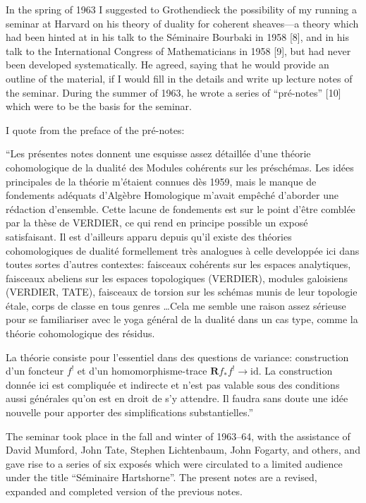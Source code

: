 \documentclass[12pt]{book}
\begin{document}
\frontmatter

\preface
In the spring of 1963 I suggested to Grothendieck the possibility of my running a seminar at Harvard on his theory of duality for coherent sheaves---a theory which had been hinted at in his talk to the Séminaire Bourbaki in 1958 [8],
and in his talk to the International Congress of Mathematicians in 1958 [9], but had never been developed systematically. He agreed, saying that he would provide an outline of the material, if I would fill in the details and write up lecture notes of the seminar. During the summer of 1963, he wrote a series of ``pré-notes'' [10] which were to be the basis for the seminar.

I quote from the preface of the pré-notes:

``Les présentes notes donnent une esquisse assez détaillée d'une théorie cohomologique de la dualité des Modules cohérents sur les préschémas. Les idées principales de la théorie m'étaient connues dès 1959, mais le manque de fondements adéquats d'Algèbre Homologique m'avait empêché d'aborder une rédaction d'ensemble. Cette lacune de fondements est sur le point d'être comblée par la thèse de VERDIER, ce qui rend en principe possible un exposé satisfaisant. Il est d'ailleurs
apparu depuis qu'il existe des théories cohomologiques de dualité formellement très analogues à celle developpée ici dans toutes sortes d'autres contextes: faisceaux cohérents
sur les espaces analytiques, faisceaux abeliens sur les
espaces topologiques (VERDIER), modules galoisiens (VERDIER, TATE), faisceaux de torsion sur les schémas munis de leur topologie étale, corps de classe en tous genres \ldots Cela me semble une raison assez sérieuse pour se familiariser avec le yoga général de la dualité dans un cas type, comme
la théorie cohomologique des résidus.

La théorie consiste pour l'essentiel dans des questions de variance: construction d'un foncteur $f^!$ et d'un homomorphisme-trace $\mathbf{R}f_*f^! \to \mathrm{id}$. La construction donnée ici est compliquée et indirecte et n'est pas valable sous des conditions aussi générales qu'on est en droit de s'y attendre. Il faudra sans doute une idée nouvelle pour apporter des simplifications substantielles.''

The seminar took place in the fall and winter of 1963--64, with the assistance of David Mumford, John Tate, Stephen Lichtenbaum, John Fogarty, and others, and gave rise to a
series of six exposés which were circulated to a limited audience under the title ``Séminaire Hartshorne''. The present
notes are a revised, expanded and completed version of the previous notes.
\end{document}
